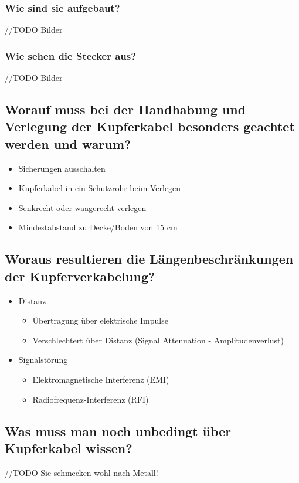 \subsubsection*{Wie sind sie aufgebaut?}
//TODO Bilder

\subsubsection*{Wie sehen die Stecker aus?}
//TODO Bilder

\subsection*{Worauf muss bei der Handhabung und Verlegung der Kupferkabel besonders geachtet werden und warum?}
\begin{itemize}
    \item Sicherungen ausschalten
    \item Kupferkabel in ein Schutzrohr beim Verlegen
    \item Senkrecht oder waagerecht verlegen
    \item Mindestabstand zu Decke/Boden von 15 cm
\end{itemize}

\subsection*{Woraus resultieren die Längenbeschränkungen der Kupferverkabelung?}
\begin{itemize}
    \item Distanz
    \begin{itemize}
        \item Übertragung über elektrische Impulse
        \item Verschlechtert über Distanz (Signal Attenuation - Amplitudenverlust)
    \end{itemize}
    \item Signalstörung
    \begin{itemize}
        \item Elektromagnetische Interferenz (EMI)
        \item Radiofrequenz-Interferenz (RFI)
    \end{itemize}
\end{itemize}

\subsection*{Was muss man noch unbedingt über Kupferkabel wissen?}
//TODO Sie schmecken wohl nach Metall!


